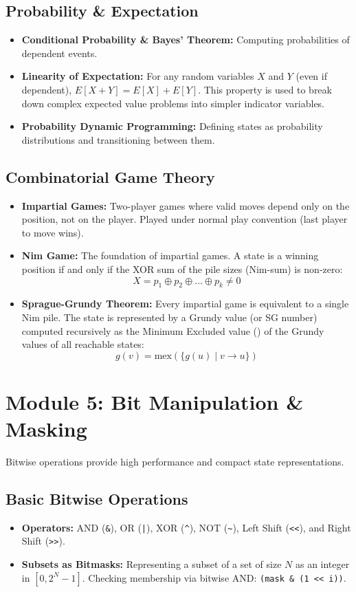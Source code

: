 \documentclass[10pt,journal,compsoc,onecolumn]{IEEEtran}
\begin{document}
\subsection{Probability \& Expectation}
\begin{itemize}
    \item \textbf{Conditional Probability \& Bayes' Theorem:} Computing probabilities of dependent events.
    \item \textbf{Linearity of Expectation:} For any random variables $X$ and $Y$ (even if dependent), $E[X+Y] = E[X] + E[Y]$. This property is used to break down complex expected value problems into simpler indicator variables.
    \item \textbf{Probability Dynamic Programming:} Defining states as probability distributions and transitioning between them.
\end{itemize}

\subsection{Combinatorial Game Theory}
\begin{itemize}
    \item \textbf{Impartial Games:} Two-player games where valid moves depend only on the position, not on the player. Played under normal play convention (last player to move wins).
    \item \textbf{Nim Game:} The foundation of impartial games. A state is a winning position if and only if the XOR sum of the pile sizes (Nim-sum) is non-zero:
    \[
    X = p_1 \oplus p_2 \oplus \dots \oplus p_k \neq 0
    \]
    \item \textbf{Sprague-Grundy Theorem:} Every impartial game is equivalent to a single Nim pile. The state is represented by a Grundy value (or SG number) computed recursively as the Minimum Excluded value () of the Grundy values of all reachable states:
    \[
    g(v) = \text{mex}(\{g(u) \mid v \to u\})
    \]
\end{itemize}

\section{Module 5: Bit Manipulation \& Masking}
\label{sec:bitmask}

Bitwise operations provide high performance and compact state representations.

\subsection{Basic Bitwise Operations}
\begin{itemize}
    \item \textbf{Operators:} AND (\texttt{\&}), OR (\texttt{|}), XOR (\texttt{\^}), NOT (\texttt{\~}), Left Shift (\texttt{<<}), and Right Shift (\texttt{>>}).
    \item \textbf{Subsets as Bitmasks:} Representing a subset of a set of size $N$ as an integer in $[0, 2^N-1]$. Checking membership via bitwise AND: \texttt{(mask \& (1 << i))}.
\end{itemize}
\end{document}
